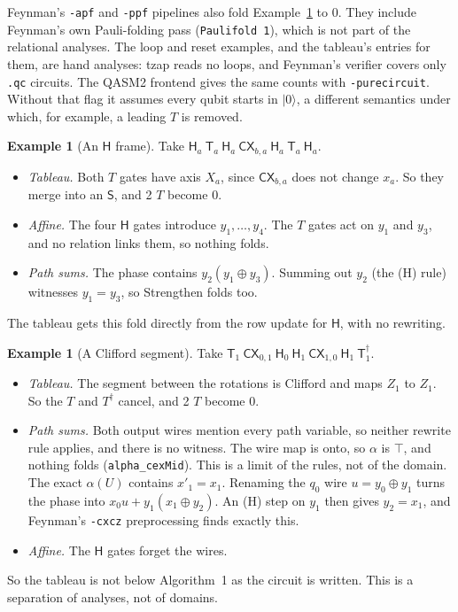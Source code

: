 \documentclass[11pt]{article}
\theoremstyle{definition}
\newtheorem{example}[theorem]{Example}
\theoremstyle{remark}
\newcommand{\adj}{^{\dagger}}
\newcommand{\gate}[1]{\mathsf{#1}}
\begin{document}
Feynman's \texttt{-apf} and \texttt{-ppf} pipelines also fold
Example~\ref{ex:al-pauli} to 0. They include Feynman's own Pauli-folding pass
(\texttt{Paulifold 1}), which is not part of the relational analyses. The loop and reset
examples, and the tableau's entries for them, are hand analyses: tzap reads no loops, and
Feynman's verifier covers only \texttt{.qc} circuits. The QASM2 frontend gives the same
counts with \texttt{-purecircuit}. Without that flag it assumes every qubit starts in
$|0\rangle$, a different semantics under which, for example, a leading $T$ is removed.

\begin{example}[An $\gate H$ frame]
\label{ex:al-hframe}
Take $\gate H_a\ \gate T_a\ \gate H_a\ \gate{CX}_{b,a}\ \gate H_a\ \gate T_a\ \gate H_a$.
\begin{itemize}[nosep]
  \item \emph{Tableau.} Both $T$ gates have axis $X_a$, since $\gate{CX}_{b,a}$ does not
  change $x_a$. So they merge into an $\gate S$, and 2 $T$ become 0.
  \item \emph{Affine.} The four $\gate H$ gates introduce $y_1, \dots, y_4$. The $T$ gates
  act on $y_1$ and $y_3$, and no relation links them, so nothing folds.
  \item \emph{Path sums.} The phase contains $y_2(y_1 \oplus y_3)$. Summing out $y_2$ (the
  (H) rule) witnesses $y_1 = y_3$, so Strengthen folds too.
\end{itemize}
The tableau gets this fold directly from the row update for $\gate H$, with no rewriting.
\end{example}

\begin{example}[A Clifford segment]\label{ex:al-pauli}
Take $\gate T_1\ \gate{CX}_{0,1}\ \gate H_0\ \gate H_1\ \gate{CX}_{1,0}\ \gate H_1\ \gate T\adj_1$.
\begin{itemize}[nosep]
  \item \emph{Tableau.} The segment between the rotations is Clifford and maps $Z_1$ to
  $Z_1$. So the $T$ and $T\adj$ cancel, and 2 $T$ become 0.
  \item \emph{Path sums.} Both output wires mention every path variable, so neither rewrite
  rule applies, and there is no witness. The wire map is onto, so $\alpha$ is $\top$,
  and nothing folds (\texttt{alpha\_cexMid}). This is a limit of the rules, not of the
  domain. The exact $\alpha(U)$ contains $x'_1 = x_1$. Renaming the $q_0$ wire
  $u = y_0 \oplus y_1$ turns the phase into $x_0u + y_1(x_1 \oplus y_2)$. An (H) step on
  $y_1$ then gives $y_2 = x_1$, and Feynman's \texttt{-cxcz} preprocessing finds exactly
  this.
  \item \emph{Affine.} The $\gate H$ gates forget the wires.
\end{itemize}
So the tableau is not below Algorithm~1 as the circuit is written. This is a separation of
analyses, not of domains.
\end{example}
\end{document}
